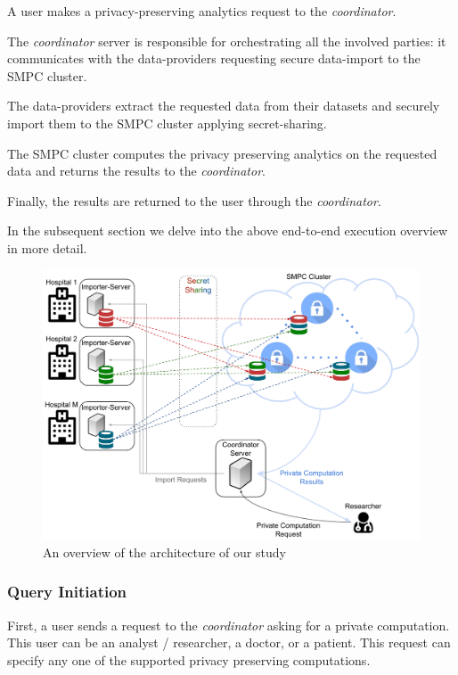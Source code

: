 \begin{description}[labelwidth=4em, leftmargin=\dimexpr\labelwidth+\labelsep\relax]
    \item [Step 1:] A user makes a privacy\hyp preserving analytics request to the \textit{coordinator}.
    \item [Step 2:] The \textit{coordinator} server is responsible for orchestrating all the involved parties: it communicates with the data\hyp providers requesting secure data\hyp import to the SMPC cluster.
    \item [Step 3:] The data\hyp providers extract the requested data from their datasets and securely import them to the SMPC cluster applying secret\hyp sharing.
    \item [Step 4:] The SMPC cluster computes the privacy preserving analytics on the requested data and returns the results to the \textit{coordinator}.
    \item [Step 5:] Finally, the results are returned to the user through the \textit{coordinator}.
\end{description}

In the subsequent section we delve into the above end\hyp to\hyp end execution overview in more detail.

\begin{figure}[t]
  \centering
  \includegraphics[width=\linewidth]{figures/overview.pdf}
  \caption{An overview of the architecture of our study}\label{f:overview}
\end{figure}

\subsubsection{Query Initiation}\label{sss:query-initiation}
First, a user sends a request to the \textit{coordinator} asking for a private computation.
This user can be an analyst / researcher, a doctor, or a patient.
This request can specify any one of the supported privacy preserving computations.

